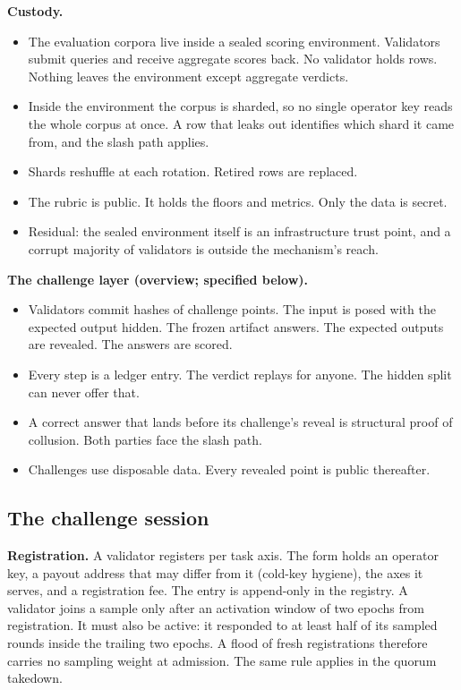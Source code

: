 \documentclass[11pt]{article}
\begin{document}
\textbf{Custody.}
\begin{itemize}
\item The evaluation corpora live inside a sealed scoring
environment. Validators submit queries and receive aggregate
scores back. No validator holds rows. Nothing leaves the
environment except aggregate verdicts.
\item Inside the environment the corpus is sharded, so no single
operator key reads the whole corpus at once. A row that leaks out
identifies which shard it came from, and the slash path applies.
\item Shards reshuffle at each rotation. Retired rows are
replaced.
\item The rubric is public. It holds the floors and metrics. Only
the data is secret.
\item Residual: the sealed environment itself is an
infrastructure trust point, and a corrupt majority of validators
is outside the mechanism's reach.
\end{itemize}

\textbf{The challenge layer (overview; specified below).}
\begin{itemize}
\item Validators commit hashes of challenge points. The input is
posed with the expected output hidden. The frozen artifact
answers. The expected outputs are revealed. The answers are
scored.
\item Every step is a ledger entry. The verdict replays for
anyone. The hidden split can never offer that.
\item A correct answer that lands before its challenge's reveal
is structural proof of collusion. Both parties face the slash
path.
\item Challenges use disposable data. Every revealed point is
public thereafter.
\end{itemize}

\subsection{The challenge session}

\textbf{Registration.} A validator registers per task axis. The
form holds an operator key, a payout address that may differ from
it (cold-key hygiene), the axes it serves, and a registration fee.
The entry is append-only in the registry. A validator joins a
sample only after an activation window of two epochs from
registration. It must also be active: it responded to at least
half of its sampled rounds inside the trailing two epochs. A
flood of fresh registrations therefore carries no sampling weight
at admission. The same rule applies in the quorum takedown.
\end{document}
